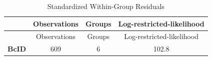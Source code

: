 \documentclass[]{article}
\begin{document}
\begin{longtable}[]{@{}cccc@{}}
\caption{Standardized Within-Group Residuals}\tabularnewline
\toprule
\begin{minipage}[b]{0.14\columnwidth}\centering\strut
~\strut
\end{minipage} & \begin{minipage}[b]{0.18\columnwidth}\centering\strut
Observations\strut
\end{minipage} & \begin{minipage}[b]{0.11\columnwidth}\centering\strut
Groups\strut
\end{minipage} & \begin{minipage}[b]{0.33\columnwidth}\centering\strut
Log-restricted-likelihood\strut
\end{minipage}\tabularnewline
\midrule
\endfirsthead
\toprule
\begin{minipage}[b]{0.14\columnwidth}\centering\strut
~\strut
\end{minipage} & \begin{minipage}[b]{0.18\columnwidth}\centering\strut
Observations\strut
\end{minipage} & \begin{minipage}[b]{0.11\columnwidth}\centering\strut
Groups\strut
\end{minipage} & \begin{minipage}[b]{0.33\columnwidth}\centering\strut
Log-restricted-likelihood\strut
\end{minipage}\tabularnewline
\midrule
\endhead
\begin{minipage}[t]{0.14\columnwidth}\centering\strut
\textbf{BcID}\strut
\end{minipage} & \begin{minipage}[t]{0.18\columnwidth}\centering\strut
609\strut
\end{minipage} & \begin{minipage}[t]{0.11\columnwidth}\centering\strut
6\strut
\end{minipage} & \begin{minipage}[t]{0.33\columnwidth}\centering\strut
102.8\strut
\end{minipage}\tabularnewline
\bottomrule
\end{longtable}
\end{document}
